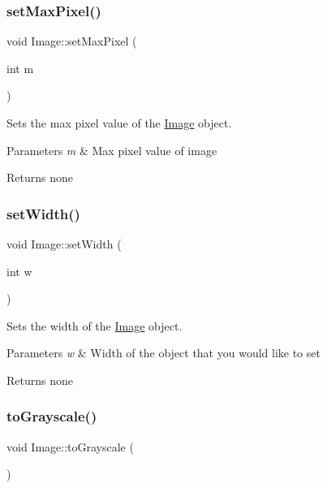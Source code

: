 \subsubsection{\texorpdfstring{set\+Max\+Pixel()}{setMaxPixel()}}
{\footnotesize\ttfamily void Image\+::set\+Max\+Pixel (\begin{DoxyParamCaption}\item[{int}]{m }\end{DoxyParamCaption})}

Sets the max pixel value of the \hyperlink{class_image}{Image} object.


\begin{DoxyParams}{Parameters}
{\em m} & Max pixel value of image \\
\hline
\end{DoxyParams}
\begin{DoxyReturn}{Returns}
none 
\end{DoxyReturn}
\mbox{\label{class_image_a385abd0ecca8787fe15d9a72ac60001a}} 
\subsubsection{\texorpdfstring{set\+Width()}{setWidth()}}
{\footnotesize\ttfamily void Image\+::set\+Width (\begin{DoxyParamCaption}\item[{int}]{w }\end{DoxyParamCaption})}

Sets the width of the \hyperlink{class_image}{Image} object.


\begin{DoxyParams}{Parameters}
{\em w} & Width of the object that you would like to set \\
\hline
\end{DoxyParams}
\begin{DoxyReturn}{Returns}
none 
\end{DoxyReturn}
\mbox{\label{class_image_ad6a65050729083c4e64c2a1cb4f5ee41}} 
\subsubsection{\texorpdfstring{to\+Grayscale()}{toGrayscale()}}
{\footnotesize\ttfamily void Image\+::to\+Grayscale (\begin{DoxyParamCaption}{ }\end{DoxyParamCaption})}

